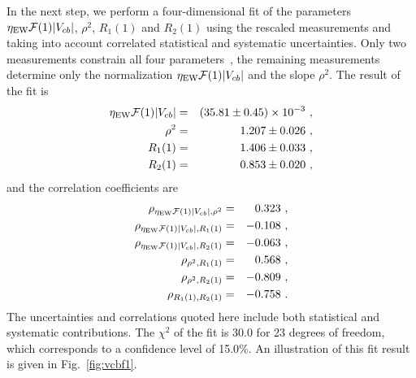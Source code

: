 In the next step, we perform a four-dimensional fit of the parameters
$\eta_\mathrm{EW}{\cal F}(1)|V_{cb}|$, $\rho^2$, $R_1(1)$ and $R_2(1)$
using the rescaled measurements and taking into account correlated
statistical and systematic uncertainties. Only two measurements
constrain all four parameters~\cite{Dungel:2010uk,Aubert:2006mb}, the remaining
measurements determine only the normalization $\eta_\mathrm{EW}{\cal
  F}(1)|V_{cb}|$ and the slope $\rho^2$. The result of the fit is
\begin{eqnarray}
  \eta_\mathrm{EW}{\cal F}(1)|V_{cb}| & = & (35.81\pm 0.45)\times
  10^{-3}~, \label{eq:vcbf1} \\
  \rho^2 & = & 1.207\pm 0.026~,\\
  R_1(1) & = & 1.406\pm 0.033~, \label{eq:r1} \\
  R_2(1) & = & 0.853\pm 0.020~, \label{eq:r2}
\end{eqnarray}
and the correlation coefficients are
\begin{eqnarray}
  \rho_{\eta_\mathrm{EW}{\cal F}(1)|V_{cb}|,\rho^2} & = & 0.323~,\\
  \rho_{\eta_\mathrm{EW}{\cal F}(1)|V_{cb}|,R_1(1)} & = & -0.108~,\\
  \rho_{\eta_\mathrm{EW}{\cal F}(1)|V_{cb}|,R_2(1)} & = & -0.063~,\\
  \rho_{\rho^2,R_1(1)} & = & 0.568~,\\
  \rho_{\rho^2,R_2(1)} & = & -0.809~,\\
  \rho_{R_1(1),R_2(1)} & = & -0.758~.
\end{eqnarray}
The uncertainties and correlations quoted here include both
statistical and systematic contributions. The $\chi^2$ of the fit is
30.0 for 23 degrees of freedom, which corresponds to a confidence
level of 15.0\%. An illustration of this fit result is given in
Fig.~\ref{fig:vcbf1}.
